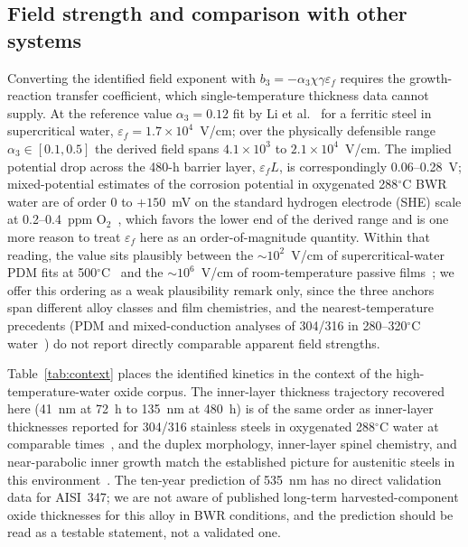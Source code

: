 \documentclass[preprint,12pt]{elsarticle}
\begin{document}
\subsection{Field strength and comparison with other systems}

Converting the identified field exponent with
$b_3 = -\alpha_3\chi\gamma\varepsilon_f$ requires the growth-reaction
transfer coefficient, which single-temperature thickness data cannot
supply. At the reference value $\alpha_3 = 0.12$ fit by Li et
al.~\citep{li2020scwpdm} for a ferritic steel in supercritical water,
$\varepsilon_f = 1.7\times10^4$~V/cm; over the physically defensible
range $\alpha_3 \in [0.1, 0.5]$ the derived field spans
$4.1\times10^3$ to $2.1\times10^4$~V/cm. The implied potential drop
across the 480-h barrier layer, $\varepsilon_f L$, is correspondingly
0.06--0.28~V; mixed-potential estimates of the corrosion potential in
oxygenated 288$^\circ$C BWR water are of order 0 to
$+150$~mV on the standard hydrogen electrode (SHE)
scale at 0.2--0.4~ppm
O$_2$~\citep{macdonald1992hwc,lin1996ecp}, which favors the lower end
of the derived range and is one more reason to treat $\varepsilon_f$
here as an order-of-magnitude quantity. Within that reading, the value
sits plausibly between the $\sim10^2$~V/cm of supercritical-water PDM
fits at 500$^\circ$C~\citep{li2020scwpdm} and the $\sim10^6$~V/cm of
room-temperature passive films~\citep{cabrera1949oxidation}; we offer
this ordering as a weak plausibility remark only, since the three
anchors span different alloy classes and film chemistries, and the
nearest-temperature precedents (PDM and mixed-conduction analyses of
304/316 in 280--320$^\circ$C
water~\citep{ss316l_pwr_pdm,bojinov_mcm,ss316ln_pdm2024}) do not report
directly comparable apparent field strengths.

Table~\ref{tab:context} places the identified kinetics in the context
of the high-temperature-water oxide corpus. The inner-layer thickness
trajectory recovered here (41~nm at 72~h to 135~nm at 480~h) is of the
same order as inner-layer thicknesses reported for 304/316 stainless
steels in oxygenated 288$^\circ$C water at comparable
times~\citep{kuang2010oxidation,kim1999oxide}, and the duplex
morphology, inner-layer spinel chemistry, and near-parabolic inner
growth match the established picture for austenitic steels in this
environment~\citep{robertson1991mechanism,stellwag1998mechanism,ziemniak2002corrosion}.
The ten-year prediction of 535~nm has no direct validation data for
AISI~347; we are not aware of published long-term harvested-component
oxide thicknesses for this alloy in BWR conditions, and the prediction
should be read as a testable statement, not a validated one.
\end{document}

